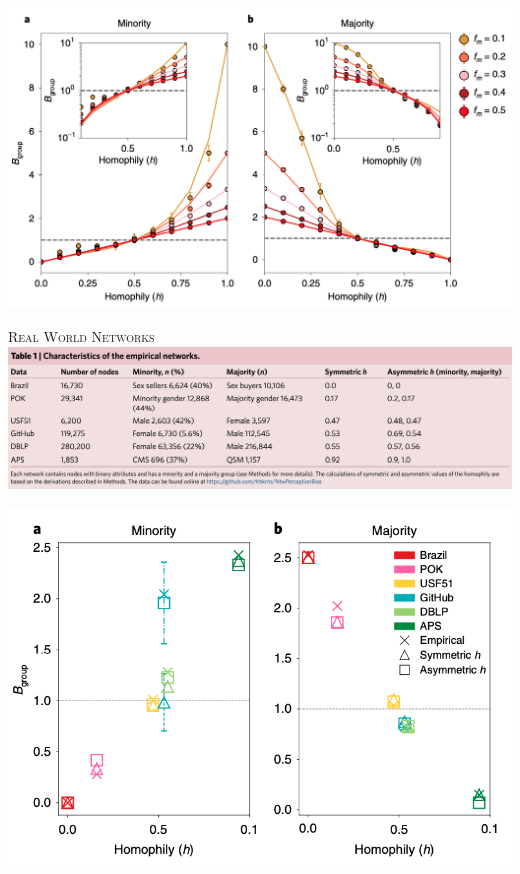 \documentclass{beamer}
\begin{document}
\begin{frame}
    \begin{center}
        \includegraphics[width=.75\textwidth]{static/model_results.png}
    \end{center}
\end{frame}

\begin{frame}
    \centering
    \Large{\textsc{Real World Networks}} \\ \vspace{1cm}
    \includegraphics[width=\textwidth]{static/real_world_networks.png}
\end{frame}

\begin{frame}
    \begin{center}
        \includegraphics[width=.75\textwidth]{static/real_world_networks_results.png}
    \end{center}
\end{frame}
\end{document}

